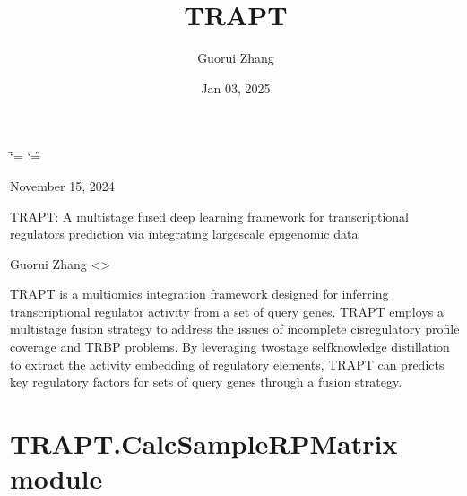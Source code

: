 \documentclass[letterpaper,10pt,english]{sphinxmanual}
\title{TRAPT}
\date{Jan 03, 2025}
\author{Guorui Zhang}
\begin{document}
\ifdefined\shorthandoff
  \ifnum\catcode`\=\string=\active\shorthandoff{=}\fi
  \ifnum\catcode`\"=\active{}\fi
\fi

\pagestyle{empty}
\sphinxmaketitle
\pagestyle{plain}
\sphinxtableofcontents
\pagestyle{normal}
\label{\detokenize{index::doc}}


\sphinxAtStartPar
November 15, 2024

\sphinxAtStartPar
{} TRAPT: A multi\sphinxhyphen{}stage fused deep learning framework for transcriptional
regulators prediction via integrating large\sphinxhyphen{}scale epigenomic data

\sphinxAtStartPar
{} Guorui Zhang \textless{}\textgreater{}

\sphinxAtStartPar
{} TRAPT is a multi\sphinxhyphen{}omics integration framework designed
for inferring transcriptional regulator activity from a set of query genes.
TRAPT employs a multi\sphinxhyphen{}stage fusion strategy to address the issues
of incomplete cis\sphinxhyphen{}regulatory profile coverage and TRBP problems.
By leveraging two\sphinxhyphen{}stage self\sphinxhyphen{}knowledge distillation to extract the activity
embedding of regulatory elements, TRAPT can predicts key regulatory
factors for sets of query genes through a fusion strategy.


\chapter{TRAPT.CalcSampleRPMatrix module}
\label{\detokenize{index:module-TRAPT.CalcSampleRPMatrix}}\label{\detokenize{index:trapt-calcsamplerpmatrix-module}}
\end{document}
